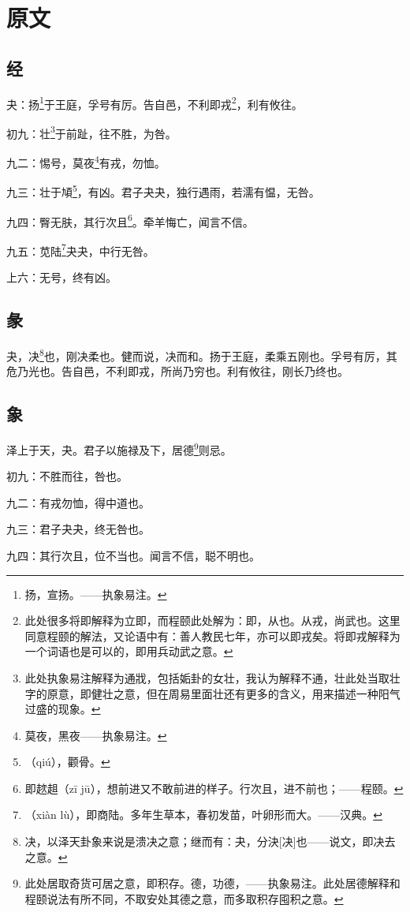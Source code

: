 \documentclass[12pt,oneside]{book}
\begin{document}
\section{原文}

\subsection{经}
夬：扬\footnote{扬，宣扬。——执象易注。}于王庭，孚号有厉。告自邑，不利即戎\footnote{此处很多将即解释为立即，而程颐此处解为：即，从也。从戎，尚武也。这里同意程颐的解法，又论语中有：善人教民七年，亦可以即戎矣。将即戎解释为一个词语也是可以的，即用兵动武之意。}，利有攸往。

初九：壮\footnote{此处执象易注解释为通戕，包括姤卦的女壮，我认为解释不通，壮此处当取壮字的原意，即健壮之意，但在周易里面壮还有更多的含义，用来描述一种阳气过盛的现象。}于前趾，往不胜，为咎。

九二：惕号，莫夜\footnote{莫夜，黑夜——执象易注。}有戎，勿恤。

九三：壮于頄\footnote{（qiú），颧骨。}，有凶。君子夬夬，独行遇雨，若濡有愠，无咎。

九四：臀无肤，其行次且\footnote{即趑趄（zī jū），想前进又不敢前进的样子。行次且，进不前也；——程颐。}。牵羊悔亡，闻言不信。

九五：苋陆\footnote{（xiàn lù），即商陆。多年生草本，春初发苗，叶卵形而大。——汉典。}夬夬，中行无咎。

上六：无号，终有凶。

\subsection{彖}
夬，决\footnote{决，以泽天卦象来说是溃决之意；继而有：夬，分決[决]也——说文，即决去之意。}也，刚决柔也。健而说，决而和。扬于王庭，柔乘五刚也。孚号有厉，其危乃光也。告自邑，不利即戎，所尚乃穷也。利有攸往，刚长乃终也。

\subsection{象}
泽上于天，夬。君子以施禄及下，居德\footnote{此处居取奇货可居之意，即积存。德，功德，——执象易注。此处居德解释和程颐说法有所不同，不取安处其德之意，而多取积存囤积之意。}则忌。

初九：不胜而往，咎也。

九二：有戎勿恤，得中道也。

九三：君子夬夬，终无咎也。

九四：其行次且，位不当也。闻言不信，聪不明也。
\end{document}
